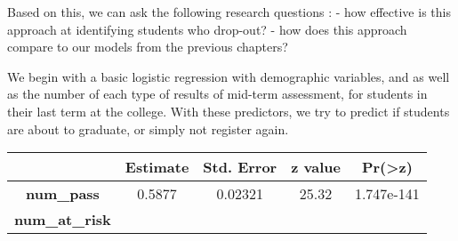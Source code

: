 \documentclass[]{book}
\theoremstyle{definition}
\theoremstyle{definition}
\theoremstyle{remark}
\begin{document}
Based on this, we can ask the following research questions : - how
effective is this approach at identifying students who drop-out? - how
does this approach compare to our models from the previous chapters?

We begin with a basic logistic regression with demographic variables,
and as well as the number of each type of results of mid-term
assessment, for students in their last term at the college. With these
predictors, we try to predict if students are about to graduate, or
simply not register again.

\begin{longtable}[]{@{}ccccc@{}}
\toprule
\begin{minipage}[b]{0.30\columnwidth}\centering\strut
~\strut
\end{minipage} & \begin{minipage}[b]{0.13\columnwidth}\centering\strut
Estimate\strut
\end{minipage} & \begin{minipage}[b]{0.16\columnwidth}\centering\strut
Std. Error\strut
\end{minipage} & \begin{minipage}[b]{0.12\columnwidth}\centering\strut
z value\strut
\end{minipage} & \begin{minipage}[b]{0.12\columnwidth}\centering\strut
Pr(\textgreater{}\textbar{}z\textbar{})\strut
\end{minipage}\tabularnewline
\midrule
\endhead
\begin{minipage}[t]{0.30\columnwidth}\centering\strut
\textbf{num\_pass}\strut
\end{minipage} & \begin{minipage}[t]{0.13\columnwidth}\centering\strut
0.5877\strut
\end{minipage} & \begin{minipage}[t]{0.16\columnwidth}\centering\strut
0.02321\strut
\end{minipage} & \begin{minipage}[t]{0.12\columnwidth}\centering\strut
25.32\strut
\end{minipage} & \begin{minipage}[t]{0.12\columnwidth}\centering\strut
1.747e-141\strut
\end{minipage}\tabularnewline
\begin{minipage}[t]{0.30\columnwidth}\centering\strut
\textbf{num\_at\_risk}\strut
\end{minipage} & \begin{minipage}[t]{0.13\columnwidth}\centering\strut

\end{minipage}
\end{longtable}
\end{document}
